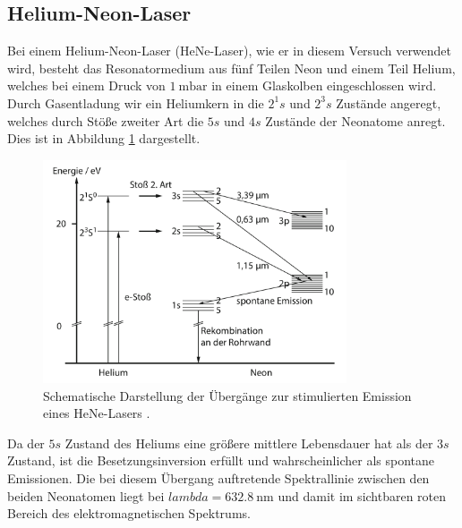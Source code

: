 \subsection{Helium-Neon-Laser}
\label{sec:Helium-Neon-Laser}
Bei einem Helium-Neon-Laser (HeNe-Laser), wie er in diesem Versuch verwendet wird,
besteht das Resonatormedium aus fünf Teilen Neon und einem Teil Helium, welches
bei einem Druck von $\SI{1}{\milli\bar}$ in einem Glaskolben eingeschlossen wird.
Durch Gasentladung wir ein Heliumkern in die $2^1s$ und $2^3s$ Zustände angeregt,
welches durch Stöße zweiter Art die $5s$ und $4s$ Zustände der Neonatome anregt.
Dies ist in Abbildung \ref{fig:HeNe} dargestellt.
\begin{figure}
  \centering
  \includegraphics[width=0.8\textwidth]{content/HeNe.pdf}
  \caption{Schematische Darstellung der Übergänge zur stimulierten
  Emission eines HeNe-Lasers \cite[68]{eichler}.}
  \label{fig:HeNe}
\end{figure}

Da der $5s$ Zustand des Heliums eine größere mittlere Lebensdauer hat als der $3s$ Zustand,
ist die Besetzungsinversion erfüllt und wahrscheinlicher als spontane Emissionen.
Die bei diesem Übergang auftretende Spektrallinie zwischen den beiden Neonatomen liegt bei
$lambda = \SI{632.8}{\nano\metre}$ und damit im sichtbaren roten Bereich des elektromagnetischen
Spektrums.

